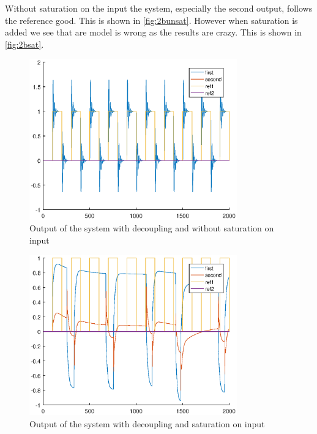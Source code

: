 \documentclass[a4paper]{scrartcl}
\begin{document}
Without saturation on the input the system, especially the second output, follows the reference good. This is shown in \autoref{fig:2bunsat}. However when saturation is added we see that are model is wrong as the results are crazy. This is shown in \autoref{fig:2bsat}.
\begin{figure}[ht!]
	\centering
	\includegraphics[width=0.8\textwidth]{fig/decoup_unsaturated.eps}
	\caption{Output of the system with decoupling and without saturation on input}
	\label{fig:2bunsat}
\end{figure}
\begin{figure}[ht!]
	\centering
	\includegraphics[width=0.8\textwidth]{fig/decoup_saturated.eps}
	\caption{Output of the system with decoupling and saturation on input}
	\label{fig:2bsat}
\end{figure}

\clearpage
\end{document}
